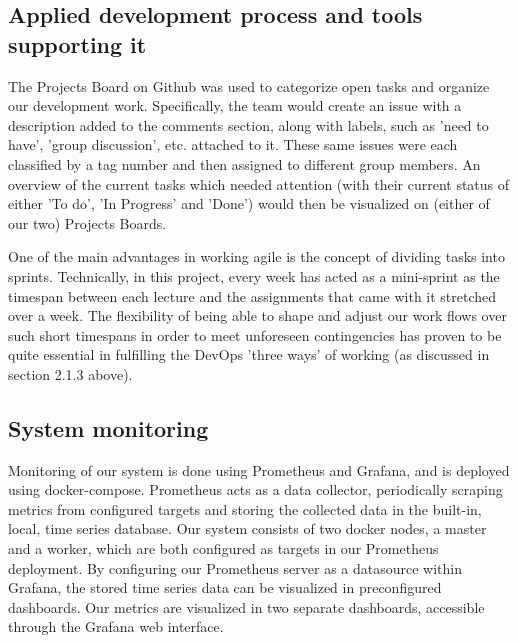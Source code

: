 \subsection{Applied development process and tools supporting it}
The Projects Board on Github was used to categorize open tasks and organize our development work. Specifically, the team would create an issue with a description added to the comments section, along with labels, such as 'need to have', 'group discussion', etc. attached to it. These same issues were each classified by a tag number and then assigned to different group members. An overview of the current tasks which needed attention (with their current status of either 'To do', 'In Progress' and 'Done') would then be visualized on (either of our two) Projects Boards.

One of the main advantages in working agile is the concept of dividing tasks into sprints. 
Technically, in this project, every week has acted as a mini-sprint as the timespan between each lecture and the assignments that came with it stretched over a week. 
The flexibility of being able to shape and adjust our work flows over such short timespans in order to meet unforeseen contingencies has proven to be quite essential in fulfilling the DevOps 'three ways' of working (as discussed in section 2.1.3 above).  

  
\subsection{System monitoring}
Monitoring of our system is done using Prometheus and Grafana, and is deployed using docker-compose. \newline
Prometheus acts as a data collector, periodically scraping metrics from configured targets and storing the collected data in the built-in, local, time series database.\newline
Our system consists of two docker nodes, a master and a worker, which are both configured as targets in our Prometheus deployment.\newline
By configuring our Prometheus server as a datasource within Grafana, the stored time series data can be visualized in preconfigured dashboards. Our metrics are visualized in two separate dashboards, accessible through the Grafana web interface.

